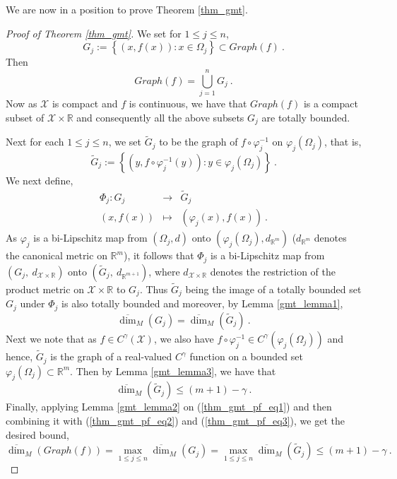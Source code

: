 \documentclass[12pt]{amsart}
\theoremstyle{definition}
\newcommand{\R}{\mathbb R}%
\numberwithin{equation}{section}
\begin{document}
We are now in a position to prove Theorem \ref{thm_gmt}.
\begin{proof}[Proof of Theorem \ref{thm_gmt}]
We set for $1 \le j \le n$,
\begin{equation*}
G_j:= \left\{\left(x,f(x)\right) : x \in \Omega_j\right\} \subset Graph(f)\:.
\end{equation*}
Then
\begin{equation} \label{thm_gmt_pf_eq1}
Graph(f) = \bigcup_{j=1}^n G_j\:.
\end{equation}
Now as $\mathcal{X}$ is compact and $f$ is continuous, we have that $Graph(f)$ is a compact subset of $\mathcal{X} \times \R$ and consequently all the above subsets $G_j$ are totally bounded. 

Next for each $1 \le j \le n$, we set $\tilde{G}_j$ to be the graph of  $f \circ \varphi^{-1}_j$ on $\varphi_j\left(\Omega_j\right)$, that is,
\begin{equation*}
\tilde{G}_j:=\left\{\left(y,f \circ \varphi^{-1}_j(y)\right) : y \in \varphi_j\left(\Omega_j\right)\right\}\:.
\end{equation*}
We next define,
\begin{eqnarray*}
\Phi_j : G_j &\to & \tilde{G}_j \\
\left(x,f(x)\right) &\mapsto & \left(\varphi_j(x),f(x)\right)\:.
\end{eqnarray*}
As $\varphi_j$ is a bi-Lipschitz map from $\left(\Omega_j,d\right)$ onto $\left(\varphi_j\left(\Omega_j\right),d_{\R^m}\right)$ ($d_{\R^m}$ denotes the canonical metric on $\R^m$), it follows that $\Phi_j$ is a bi-Lipschitz map from $\left(G_j,\:d_{\mathcal{X} \times \R}\right)$ onto  $\left(\tilde{G}_j,\:d_{\R^{m+1}}\right)$, where $d_{\mathcal{X} \times \R}$ denotes the restriction of the product metric on $\mathcal{X} \times \R$ to $G_j$. Thus $\tilde{G}_j$ being the image of a totally bounded set $G_j$ under $\Phi_j$ is also totally bounded and moreover, by Lemma \ref{gmt_lemma1},
\begin{equation} \label{thm_gmt_pf_eq2}
\overline{\dim}_M\left(G_j\right)=\overline{\dim}_M\left(\tilde{G}_j\right)\:.
\end{equation}
Next we note that as $f \in C^\gamma(\mathcal{X})$, we also have  $f \circ \varphi^{-1}_j \in C^\gamma(\varphi_j\left(\Omega_j\right))$ and hence, $\tilde{G}_j$ is the graph of a real-valued $C^\gamma$ function on a bounded set $\varphi_j\left(\Omega_j\right) \subset \R^m$. Then by Lemma \ref{gmt_lemma3}, we have that
\begin{equation} \label{thm_gmt_pf_eq3}
\overline{\dim}_M\left(\tilde{G}_j\right) \le (m+1)-\gamma\:.
\end{equation}
Finally, applying Lemma \ref{gmt_lemma2} on (\ref{thm_gmt_pf_eq1}) and then combining it with (\ref{thm_gmt_pf_eq2}) and (\ref{thm_gmt_pf_eq3}), we get the desired bound,
\begin{equation*}
\overline{\dim}_M\left(Graph(f)\right) =\max_{1 \le j \le n}\overline{\dim}_M\left(G_j\right)=\max_{1 \le j \le n}\overline{\dim}_M\left(\tilde{G}_j\right) \le (m+1)-\gamma\:.
\end{equation*}
\end{proof}
\end{document}
